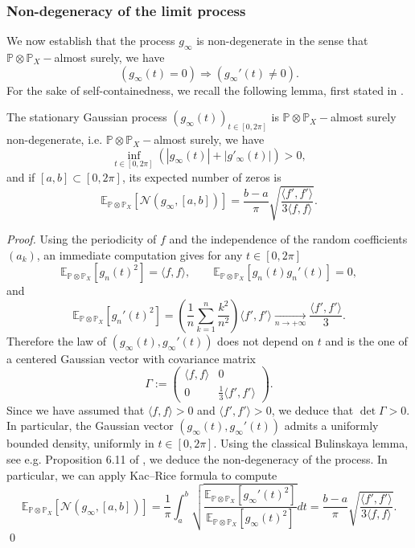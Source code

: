 \documentclass{svproc}
\newcommand{\Prob}{\mathbb{P}}
\newcommand \Esp {\mathbb{E}}
\begin{document}
\subsubsection{Non-degeneracy of the limit process}
We now establish that the process $g_{\infty}$ is non-degenerate in the sense that $\Prob \otimes \Prob_X-$almost surely, we have
$$(g_{\infty}(t)=0) \Longrightarrow (g_{\infty}'(t)\neq 0).$$
For the sake of self-containedness, we recall the following lemma, first stated in \cite{AP20IMRN}. 
\begin{lemma}\label{lm.nd.kac}
The stationary Gaussian process $(g_{\infty}(t))_{t\in[0,2\pi]}$ is $\Prob \otimes \Prob_X-$almost surely non-degenerate, i.e. $\Prob \otimes \Prob_X-$almost surely, we have
$$\inf_{t\in [0,2\pi]}(|g_{\infty}(t)| +|g'_{\infty}(t)|) >0,$$
and if $[a,b]\subset [0,2\pi]$, its expected number of zeros is
$$\Esp_{\Prob \otimes \Prob_X}\left[\mathcal{N}(g_{\infty},[a,b])\right] =\frac{b-a}{\pi}\sqrt{\frac{\langle f',f'\rangle}{3\langle f,f\rangle}}.$$
\end{lemma}
\begin{proof}
Using the periodicity of $f$ and the independence of the random coefficients $(a_k)$, an immediate computation gives for any $t \in [0,2\pi]$
\[
\Esp_{\Prob\otimes \Prob_X}[g_n(t)^2]=\langle f,f\rangle, \qquad \Esp_{\Prob\otimes \Prob_X}[g_n(t)g_n'(t)]  =0,
\]
and 
\[
\Esp_{\Prob\otimes \Prob_X}[g_n'(t)^2] = \left( \frac{1}{n} \sum_{k=1}^n \frac{k^2}{n^2} \right) \langle f',f'\rangle\xrightarrow[n \to +\infty]{} \frac{\langle f',f'\rangle}{3}.
\]
Therefore the law of $(g_{\infty}(t),g_{\infty}'(t))$ does not depend on $t$ and is the one of a centered Gaussian vector with covariance matrix
\[
\Gamma:=\left(\begin{array}{cc}\langle f,f\rangle& 0 \\0 & \frac{1}{3}\langle f',f'\rangle \end{array}\right).
\]
Since we have assumed that $\langle f,f\rangle >0$ and $\langle f',f'\rangle >0$, we deduce that $\det \Gamma >0$. In particular, the Gaussian vector $(g_{\infty}(t),g_{\infty}'(t))$ admits a uniformly bounded density, uniformly in $t \in [0,2\pi]$. 
Using the classical Bulinskaya lemma, see e.g. Proposition 6.11 of \cite{AW09},  we deduce the non-degeneracy of the process.
In particular, we can apply Kac--Rice formula to compute
\[
\Esp_{\Prob\otimes \Prob_X}[\mathcal{N}(g_{\infty},[a,b])] =\frac{1}{\pi} \int_{a}^{b}\sqrt{\frac{\Esp_{\Prob\otimes \Prob_X}[g_{\infty}'(t)^2]}{\Esp_{\Prob\otimes \Prob_X}[g_{\infty}(t)^2]}}dt= \frac{b-a}{\pi}\sqrt{\frac{\langle f',f'\rangle}{3\langle f,f\rangle}}.
\]
\qed
\end{proof}
\end{document}
